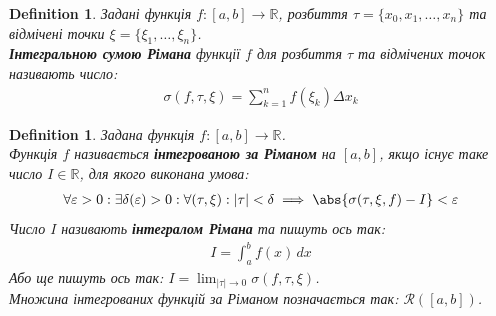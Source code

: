 \documentclass[a4paper, 10pt]{article}
\def\huge{\displaystyle}
\theoremstyle{theoremdd}
\theoremstyle{theoremdd}
\theoremstyle{theoremdd}
\newtheorem{definition}[theorem]{Definition}
\theoremstyle{theoremdd}
\theoremstyle{theoremdd}
\theoremstyle{theoremdd}
\theoremstyle{theoremdd}
\theoremstyle{theoremdd}
\theoremstyle{theoremdd}
\begin{document}
\begin{definition}
Задані функція $f \colon [a,b] \to \mathbb{R}$, розбиття $\tau = \{x_0,x_1,\dots,x_n\}$ та відмічені точки $\xi = \{\xi_1, \dots, \xi_n \}$.\\
\textbf{Інтегральною сумою Рімана} функції $f$ для розбиття $\tau$ та відмічених точок називають число:
\begin{align*}
\sigma (f, \tau, \xi) = \sum_{k=1}^n f(\xi_k) \Delta x_k
\end{align*}
\end{definition}

\begin{figure}[H]
\centering
{}
\end{figure}

\begin{definition}
Задана функція $f \colon [a,b] \to \mathbb{R}$.\\
Функція $f$ називається \textbf{інтегрованою за Ріманом} на $[a,b]$, якщо існує таке число $I \in \mathbb{R}$, для якого виконана умова:
\begin{align*}
\forall \varepsilon > 0: \exists \delta(\varepsilon) > 0: \forall (\tau, \xi): |\tau| < \delta \implies \abs{\sigma(\tau, \xi, f) - I} < \varepsilon
\end{align*}
Число $I$ називають \textbf{інтегралом Рімана} та пишуть ось так:
\begin{align*}
I = \int_a^b f(x)\,dx
\end{align*}
Або ще пишуть ось так: $I = \huge\lim_{|\tau| \to 0} \sigma(f, \tau, \xi)$. \\ 
Множина інтегрованих функцій за Ріманом позначається так: $\mathcal{R}([a,b])$.
\end{definition}
\end{document}
